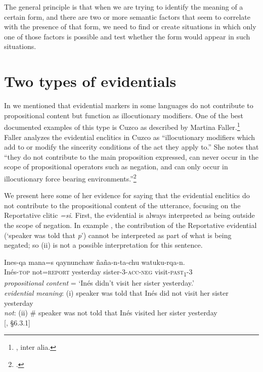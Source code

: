 The general principle is that when we are trying to identify the meaning of a certain form, and there are two or more semantic factors that seem to correlate with the presence of that form, we need to find or create situations in which only one of those factors is possible and test whether the form would appear in such situations.


\section{Two types of evidentials}\label{sec:17.5}

In  we mentioned that evidential markers in some languages do not contribute to propositional content but function as illocutionary modifiers. One of the best documented examples of this type is Cuzco  as described by Martina Faller.\footnote{\citet{Faller2002,Faller2003,Faller2006}, inter alia.} Faller analyzes the evidential enclitics in Cuzco  as “illocutionary modifiers which add to or modify the sincerity conditions of the act they apply to.” She notes that “they do not contribute to the main proposition expressed, can never occur in the scope of propositional operators such as negation, and can only occur in illocutionary force bearing environments.”\footnote{\citet[v]{Faller2002}.}



We present here some of her evidence for saying that the evidential enclitics do not contribute to the propositional content of the utterance, focusing on the Reportative clitic \textit{=si}. First, the evidential is always interpreted as being outside the scope of negation. In example , the contribution of the Reportative evidential (‘speaker was told that \textit{p}’) cannot be interpreted as part of what is being negated; so (ii) is not a possible interpretation for this sentence.


\ea \label{ex:17.6}
\gll Ines-qa  mana=s  qaynunchaw  ñaña-n-ta-chu  watuku-rqa-n.\\
Inés-\textsc{top}  not=\textsc{report}  yesterday  sister-3-\textsc{acc-neg}  visit\textsc{-past}\textsc{\textsubscript{1}}-3\\
\glt \textit{propositional content} = ‘Inés didn’t visit her sister yesterday.’\\
\textit{evidential meaning}: (i) speaker was told that Inés did not visit her sister yesterday\\
  \textit{not}:  (ii) \# speaker was not told that Inés visited her sister yesterday\\
{}[\citealt{Faller2002}, §6.3.1]
\z


